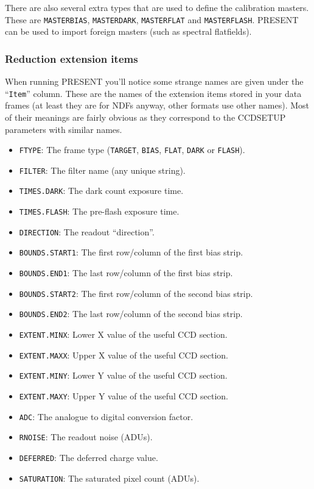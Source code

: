 \documentclass[twoside,11pt]{article}
\newcommand{\htmlref}[2]{#1}
\newcommand{\latexhtml}[2]{#1}
\newcommand{\xlabel}[1]{}
\renewcommand{\_}{\texttt{\symbol{95}}}
\newcommand{\ttsize}{\latexhtml{\small}{}}
\newcommand{\text}[1]{{\ttsize \tt #1}}
\newcommand{\routine}[1]{{\sc #1}}
\newcommand{\xroutine}[1]{\htmlref{{\sc #1}}{#1}}
\begin{document}
There are also several extra types that are used to define the
calibration masters. These are \text{MASTER\_BIAS},
\text{MASTER\_DARK}, \text{MASTER\_FLAT} and \text{MASTER\_FLASH}.
\routine{PRESENT} can be used to import foreign masters (such as
spectral flatfields).


\subsubsection{Reduction extension items \xlabel{reductionitems}}
When running \xroutine{PRESENT} you'll notice some strange names are
given under the ``\text{Item}'' column. These are the names of the
extension items stored in your data frames (at least they are for NDFs
anyway, other formats use other names). Most of their meanings are
fairly obvious as they correspond to the \xroutine{CCDSETUP}
parameters with similar names.
\begin{itemize}
\item \text{FTYPE}: The frame type (\text{TARGET}, \text{BIAS},
\text{FLAT}, \text{DARK} or \text{FLASH}).
\item \text{FILTER}: The filter name (any unique string).
\item \text{TIMES.DARK}: The dark count exposure time.
\item \text{TIMES.FLASH}: The pre-flash exposure time.
\item \text{DIRECTION}: The readout ``direction''.
\item \text{BOUNDS.START1}: The first row/column of the first bias strip.
\item \text{BOUNDS.END1}: The last row/column of the first bias strip.
\item \text{BOUNDS.START2}: The first row/column of the second bias strip.
\item \text{BOUNDS.END2}: The last row/column of the second bias strip.
\item \text{EXTENT.MINX}: Lower X value of the useful CCD section.
\item \text{EXTENT.MAXX}: Upper X value of the useful CCD section.
\item \text{EXTENT.MINY}: Lower Y value of the useful CCD section.
\item \text{EXTENT.MAXY}: Upper Y value of the useful CCD section.
\item \text{ADC}: The analogue to digital conversion factor.
\item \text{RNOISE}: The readout noise (ADUs).
\item \text{DEFERRED}: The deferred charge value.
\item \text{SATURATION}: The saturated pixel count (ADUs).
\end{itemize}
\end{document}
